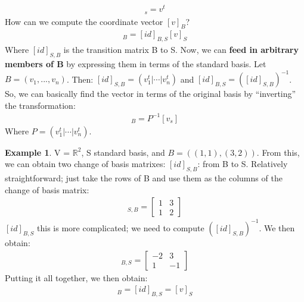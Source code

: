 \documentclass[a4paper, 12pt]{article}
\theoremstyle{definition}
\newtheorem{exmp}{Example}[section]
\theoremstyle{definition}
\theoremstyle{definition}
\theoremstyle{definition}
\begin{document}
{\begin{align*}
	[v]_s = v^t
\end{align*}
How can we compute the coordinate vector $[v]_B$? 
\begin{align*}
	[v]_B = [id]_{B,S}[v]_S 
\end{align*}
Where $[id]_{S,B}$ is the transition matrix B to S. Now, we can \textbf{feed in arbitrary members of B} by expressing them in terms of the standard basis. Let $B = (v_1, ..., v_n)$. Then: $[id]_{S,B} = (v_1^t | \cdots | v_n^t)$ and $[id]_{B,S} = ([id]_{S,B})^{-1}$. So, we can basically find the vector in terms of the original basis by ``inverting'' the transformation: 
\begin{align*}
	[v]_B = P^{-1}[v_s] 
\end{align*}
Where $P = (v_1^t| \cdots | v_n^t)$. 
\begin{exmp}
	V = $\mathbb{R}^2$, S standard basis, and $B = ((1,1),(3,2))$. From this, we can obtain two change of basis matrixes: 
	\newline
	\newline
	$[id]_{S,B}$: from B to S. Relatively straightforward; just take the rows of B and use them as the columns of the change of basis matrix: 
	\begin{align*}
		[id]_{S,B} = \begin{bmatrix}
			1 & 3 \\
			1 & 2 
		\end{bmatrix}
	\end{align*}
	$[id]_{B,S}$ this is more complicated; we need to compute $([id]_{S,B})^{-1}$. We then obtain: 
	\begin{align*}
		[id]_{B,S} = \begin{bmatrix}
			-2 & 3 \\
			1 & -1 
		\end{bmatrix}
	\end{align*}
	Putting it all together, we then obtain: 
	\begin{align*}
		[v]_B = [id]_{B,S} = [v]_S
	\end{align*}


\end{exmp}}
\end{document}
